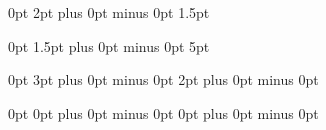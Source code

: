 \titlespacing*{\section}
  {0pt} %
  {2pt plus 0pt minus 0pt} %
  {1.5pt} %

\titlespacing*{\subsection}
  {0pt} %
  {1.5pt plus 0pt minus 0pt} %
  {5pt} %

\titlespacing*{\subsubsection}
  {0pt} %
  {3pt plus 0pt minus 0pt} %
  {2pt plus 0pt minus 0pt} %

\titlespacing*{\subsubsubsection}
  {0pt} %
  {0pt plus 0pt minus 0pt} %
  {0pt plus 0pt minus 0pt} %


\usepackage{listings} %
\usepackage{xcolor}%
\renewcommand{\lstlistingname}{Code}



